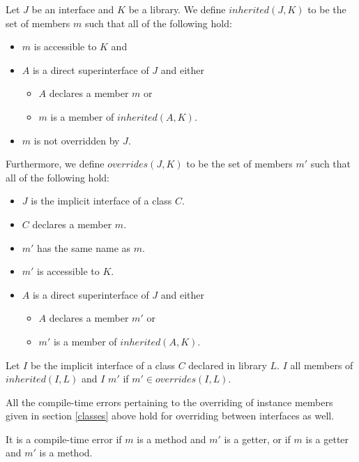 \documentclass[makeidx]{article}
\begin{document}
\LMHash{}%
Let $J$ be an interface and $K$ be a library.
We define $inherited(J, K)$ to be the set of members $m$ such that all of the following hold:
\begin{itemize}
\item $m$ is accessible to $K$ and
\item $A$ is a direct superinterface of $J$ and either
  \begin{itemize}
  \item $A$ declares a member $m$ or
  \item $m$ is a member of $inherited(A, K)$.
  \end{itemize}
\item $m$ is not overridden by $J$.
\end{itemize}

\LMHash{}%
Furthermore, we define $overrides(J, K)$ to be the set of members $m'$ such that all of the following hold:
\begin{itemize}
\item $J$ is the implicit interface of a class $C$.
\item $C$ declares a member $m$.
\item $m'$ has the same name as $m$.
\item $m'$ is accessible to $K$.
\item $A$ is a direct superinterface of $J$ and either
  \begin{itemize}
  \item $A$ declares a member $m'$ or
  \item $m'$ is a member of $inherited(A, K)$.
  \end{itemize}
\end{itemize}

\LMHash{}%
Let $I$ be the implicit interface of a class $C$ declared in library $L$.
$I$  all members of $inherited(I, L)$ and $I$  $m'$ if $m' \in overrides(I, L)$.

\LMHash{}%
All the compile-time errors pertaining to the overriding of instance members given in section \ref{classes} above hold for overriding between interfaces as well.

\LMHash{}%
It is a compile-time error if $m$ is a method and $m'$ is a getter, or if $m$ is a getter and $m'$ is a method.


\end{document}
